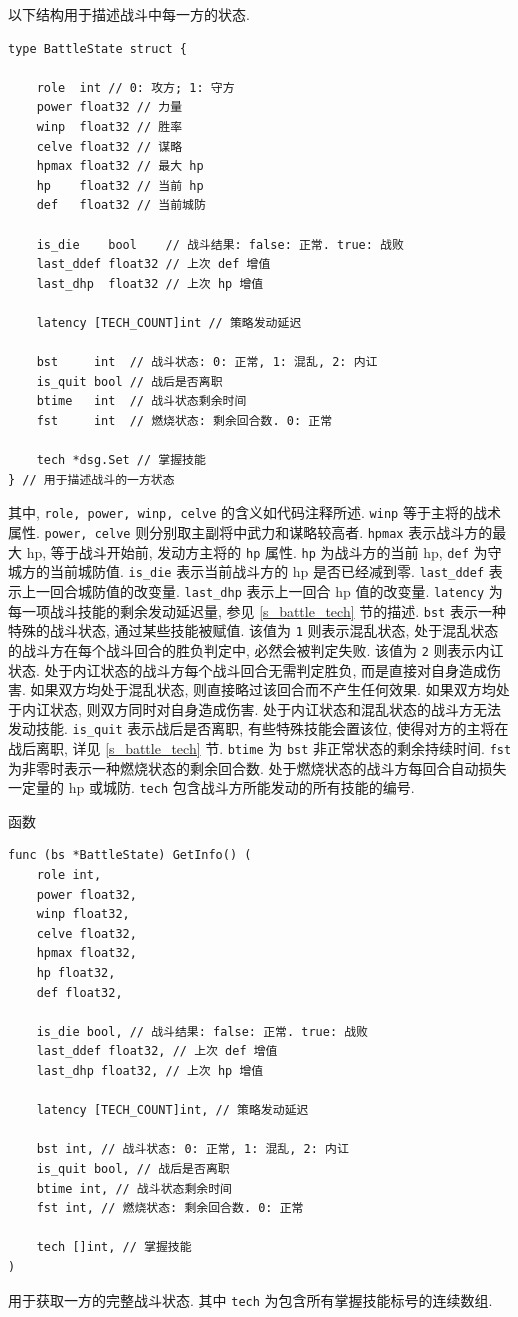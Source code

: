 \documentclass[UTF8, zihao=-4]{ctexart} %
\newcommand{\lcode}{\lstinline} % 段内插入代码
\begin{document}
以下结构用于描述战斗中每一方的状态.
\begin{lstlisting}
type BattleState struct {

	role  int // 0: 攻方; 1: 守方
	power float32 // 力量
	winp  float32 // 胜率 
	celve float32 // 谋略
	hpmax float32 // 最大 hp
	hp    float32 // 当前 hp
	def   float32 // 当前城防

	is_die    bool    // 战斗结果: false: 正常. true: 战败
	last_ddef float32 // 上次 def 增值
	last_dhp  float32 // 上次 hp 增值

	latency [TECH_COUNT]int // 策略发动延迟

	bst     int  // 战斗状态: 0: 正常, 1: 混乱, 2: 内讧
	is_quit bool // 战后是否离职
	btime   int  // 战斗状态剩余时间
	fst     int  // 燃烧状态: 剩余回合数. 0: 正常

	tech *dsg.Set // 掌握技能
} // 用于描述战斗的一方状态
\end{lstlisting}
其中, \lcode{role, power, winp, celve} 的含义如代码注释所述.
\lcode{winp} 等于主将的战术属性. \lcode{power, celve} 则分别取主副将中武力和谋略较高者.
\lcode{hpmax} 表示战斗方的最大 hp, 等于战斗开始前, 发动方主将的 \lcode{hp} 属性. 
\lcode{hp} 为战斗方的当前 hp, \lcode{def} 为守城方的当前城防值. 
\lcode{is_die} 表示当前战斗方的 hp 是否已经减到零.
\lcode{last_ddef} 表示上一回合城防值的改变量.
\lcode{last_dhp} 表示上一回合 hp 值的改变量.
\lcode{latency} 为每一项战斗技能的剩余发动延迟量, 参见 \ref{s_battle_tech} 节的描述.
\lcode{bst} 表示一种特殊的战斗状态, 通过某些技能被赋值. 
该值为 \lcode{1} 则表示混乱状态, 处于混乱状态的战斗方在每个战斗回合的胜负判定中, 必然会被判定失败.
该值为 \lcode{2} 则表示内讧状态. 处于内讧状态的战斗方每个战斗回合无需判定胜负, 而是直接对自身造成伤害.
如果双方均处于混乱状态, 则直接略过该回合而不产生任何效果. 
如果双方均处于内讧状态, 则双方同时对自身造成伤害.
处于内讧状态和混乱状态的战斗方无法发动技能.
\lcode{is_quit} 表示战后是否离职, 有些特殊技能会置该位, 使得对方的主将在战后离职, 详见 \ref{s_battle_tech} 节.
\lcode{btime} 为 \lcode{bst} 非正常状态的剩余持续时间.
\lcode{fst} 为非零时表示一种燃烧状态的剩余回合数. 处于燃烧状态的战斗方每回合自动损失一定量的 hp 或城防. 
\lcode{tech} 包含战斗方所能发动的所有技能的编号.

函数
\begin{lstlisting}
func (bs *BattleState) GetInfo() (
	role int,
	power float32,
	winp float32,
	celve float32,
	hpmax float32,
	hp float32,
	def float32,

	is_die bool, // 战斗结果: false: 正常. true: 战败
	last_ddef float32, // 上次 def 增值
	last_dhp float32, // 上次 hp 增值

	latency [TECH_COUNT]int, // 策略发动延迟

	bst int, // 战斗状态: 0: 正常, 1: 混乱, 2: 内讧
	is_quit bool, // 战后是否离职
	btime int, // 战斗状态剩余时间
	fst int, // 燃烧状态: 剩余回合数. 0: 正常

	tech []int, // 掌握技能
) 
\end{lstlisting}
用于获取一方的完整战斗状态. 其中 \lcode{tech} 为包含所有掌握技能标号的连续数组.
\end{document}
